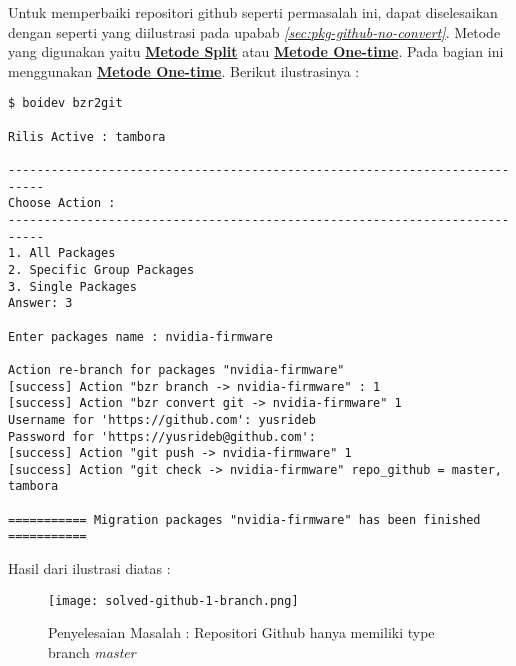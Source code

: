 \noindent
Untuk memperbaiki repositori github seperti permasalah ini, dapat diselesaikan dengan seperti yang diilustrasi pada upabab \textit{\ref{sec:pkg-github-no-convert}}. Metode yang digunakan yaitu \hyperref[implm_4]{\textbf{Metode Split}} atau \hyperref[implm_5]{\textbf{Metode One-time}}. Pada bagian ini menggunakan \hyperref[implm_5]{\textbf{Metode One-time}}. Berikut ilustrasinya :

\begin{lstlisting}[language=ShellBash3]
$ boidev bzr2git

Rilis Active : tambora

---------------------------------------------------------------------------
Choose Action : 
---------------------------------------------------------------------------
1. All Packages
2. Specific Group Packages
3. Single Packages
Answer: 3

Enter packages name : nvidia-firmware

Action re-branch for packages "nvidia-firmware" 
[success] Action "bzr branch -> nvidia-firmware" : 1
[success] Action "bzr convert git -> nvidia-firmware" 1
Username for 'https://github.com': yusrideb
Password for 'https://yusrideb@github.com': 
[success] Action "git push -> nvidia-firmware" 1
[success] Action "git check -> nvidia-firmware" repo_github = master, tambora

=========== Migration packages "nvidia-firmware" has been finished ===========

\end{lstlisting}

\noindent
Hasil dari ilustrasi diatas :

\begin{figure}[H]
	\centering
	\texttt{[image: solved-github-1-branch.png]}
	\caption{Penyelesaian Masalah : Repositori Github hanya memiliki type branch \textit{master}}
	\label{fig:bab3_solved-github-1-branch}
\end{figure}